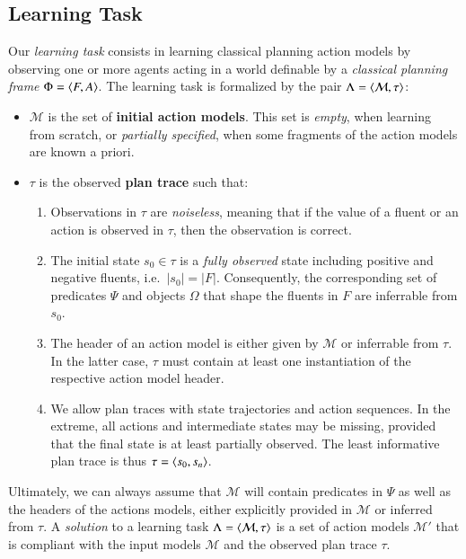 \subsection{Learning Task}
\label{learning_task}

Our {\em learning task} consists in learning classical planning action models by observing one or more agents acting in a world definable by a {\em classical planning frame} $\Phi={\langle F,A \rangle}$. The learning task is formalized by the pair $\Lambda={\langle \mathcal{M},\tau \rangle}$:


\begin{itemize}
\item $\mathcal{M}$ is the set of {\bf initial action models}. This set is {\em empty}, when learning from scratch, or {\em partially specified}, when some fragments of the action models are known a priori.
\item $\tau$ is the observed {\bf plan trace} such that:
\begin{enumerate}
 \item Observations in $\tau$ are {\em noiseless}, meaning that if the value of a fluent or an action is observed in $\tau$, then the observation is correct.
\item The initial state $s_0\in\tau$ is a {\em fully observed} state including positive and negative fluents, i.e.~$|s_0|=|F|$. Consequently, the corresponding set of predicates $\Psi$ and objects $\Omega$ that shape the fluents in $F$ are inferrable from $s_0$.
\item The header of an action model is either given by $\mathcal{M}$ or inferrable from $\tau$. In the latter case, $\tau$ must contain at least one instantiation of the respective action model header.
\item We allow plan traces with \NO state trajectories and action sequences. In the extreme, all actions and intermediate states may be missing, provided that the final state is at least partially observed. The least informative plan trace is thus $\tau = {\langle s_0,s_n \rangle}$.
\end{enumerate}
\end{itemize}

Ultimately, we can always assume that $\mathcal{M}$ will contain predicates in $\Psi$ as well as the headers of the actions models, either explicitly provided in $\mathcal{M}$ or inferred from $\tau$. A {\em solution} to a learning task $\Lambda={\langle \mathcal{M},\tau \rangle}$ is a set of action models $\mathcal{M}'$ that is compliant with the input models $\mathcal{M}$ and the observed plan trace $\tau$.

